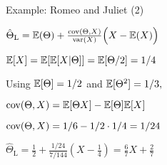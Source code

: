 \begin{frame}{Example: Romeo and Juliet (2)}

{
\small
\plitemsep 0.07in
\bci

\item[] $\hat{\Theta}_{\text{L}} = \mathbb{E}( \Theta ) + \frac{\text{cov}( \Theta,X )}{\text{var}( X )}\Bigl(X - \mathbb{E}( X )\Bigl)$

\medskip

\item<2-> $\mathbb{E}[ X ] = \mathbb{E}[ \mathbb{E}[ X|\Theta ] ]= \mathbb{E}[ \Theta/2 ] = 1/4$

\item<3->  Using $\mathbb{E}[ \Theta ] = 1/2$ and $\mathbb{E}[ \Theta^2 ] = 1/3,$

\item<4-> $\text{cov}( \Theta, X ) = \mathbb{E}[ \Theta X ] - \mathbb{E}[ \Theta ] \mathbb{E}[ X ]$


\eci
}
{
\small
\plitemsep 0.1in
\bci

\item<4->[] $\text{cov}( \Theta, X ) = 1/6 - 1/2\cdot 1/4 = 1/24$

\item<5-> $\hat{\Theta}_{\text{L}} = \frac{1}{2} + \frac{1/24}{7/144}(X - \frac{1}{4}) = \frac{6}{7}X + \frac{2}{7}$

\eci


}

\end{frame}









